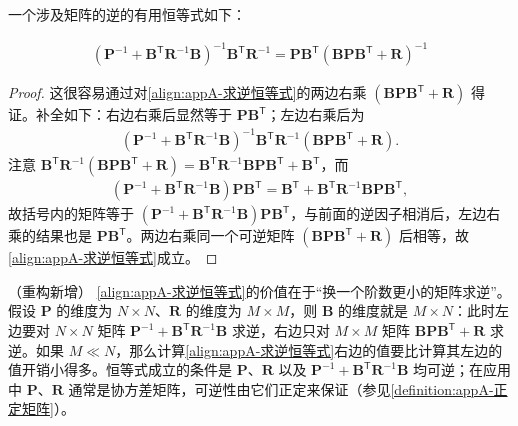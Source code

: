 \documentclass[../main.tex]{subfiles}
\begin{document}
一个涉及矩阵的逆的有用恒等式如下：
\begin{proposition}[矩阵求逆的一个恒等式]\label{proposition:appA-求逆恒等式}
\begin{align}
  (\bm{P}^{-1}+\bm{B}^{\mathsf{T}}\bm{R}^{-1}\bm{B})^{-1}\bm{B}^{\mathsf{T}}\bm{R}^{-1}=\bm{P}\bm{B}^{\mathsf{T}}(\bm{B}\bm{P}\bm{B}^{\mathsf{T}}+\bm{R})^{-1}
  \label{align:appA-求逆恒等式}
\end{align}
\end{proposition}

\begin{proof}
这很容易通过对\eqref{align:appA-求逆恒等式}的两边右乘 $(\bm{B}\bm{P}\bm{B}^{\mathsf{T}}+\bm{R})$ 得证。补全如下：右边右乘后显然等于 $\bm{P}\bm{B}^{\mathsf{T}}$；左边右乘后为
\begin{align*}
  (\bm{P}^{-1}+\bm{B}^{\mathsf{T}}\bm{R}^{-1}\bm{B})^{-1}\bm{B}^{\mathsf{T}}\bm{R}^{-1}(\bm{B}\bm{P}\bm{B}^{\mathsf{T}}+\bm{R}).
\end{align*}
注意 $\bm{B}^{\mathsf{T}}\bm{R}^{-1}(\bm{B}\bm{P}\bm{B}^{\mathsf{T}}+\bm{R})=\bm{B}^{\mathsf{T}}\bm{R}^{-1}\bm{B}\bm{P}\bm{B}^{\mathsf{T}}+\bm{B}^{\mathsf{T}}$，而
\begin{align*}
  (\bm{P}^{-1}+\bm{B}^{\mathsf{T}}\bm{R}^{-1}\bm{B})\bm{P}\bm{B}^{\mathsf{T}}=\bm{B}^{\mathsf{T}}+\bm{B}^{\mathsf{T}}\bm{R}^{-1}\bm{B}\bm{P}\bm{B}^{\mathsf{T}},
\end{align*}
故括号内的矩阵等于 $(\bm{P}^{-1}+\bm{B}^{\mathsf{T}}\bm{R}^{-1}\bm{B})\bm{P}\bm{B}^{\mathsf{T}}$，与前面的逆因子相消后，左边右乘的结果也是 $\bm{P}\bm{B}^{\mathsf{T}}$。两边右乘同一个可逆矩阵 $(\bm{B}\bm{P}\bm{B}^{\mathsf{T}}+\bm{R})$ 后相等，故\eqref{align:appA-求逆恒等式}成立。
\end{proof}

\begin{remark}（重构新增）
\eqref{align:appA-求逆恒等式}的价值在于“换一个阶数更小的矩阵求逆”。假设 $\bm{P}$ 的维度为 $N\times N$、$\bm{R}$ 的维度为 $M\times M$，则 $\bm{B}$ 的维度就是 $M\times N$：此时左边要对 $N\times N$ 矩阵 $\bm{P}^{-1}+\bm{B}^{\mathsf{T}}\bm{R}^{-1}\bm{B}$ 求逆，右边只对 $M\times M$ 矩阵 $\bm{B}\bm{P}\bm{B}^{\mathsf{T}}+\bm{R}$ 求逆。如果 $M\ll N$，那么计算\eqref{align:appA-求逆恒等式}右边的值要比计算其左边的值开销小得多。恒等式成立的条件是 $\bm{P}$、$\bm{R}$ 以及 $\bm{P}^{-1}+\bm{B}^{\mathsf{T}}\bm{R}^{-1}\bm{B}$ 均可逆；在应用中 $\bm{P}$、$\bm{R}$ 通常是协方差矩阵，可逆性由它们正定来保证（参见\cref{definition:appA-正定矩阵}）。
\end{remark}
\end{document}

